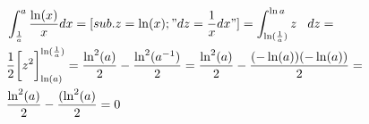 \documentclass[a4paper]{article}
\begin{document}
\section{}
\begin{align*}
& \int^a_{\frac{1}{a}} \frac{\ln(x)}{x} dx = [sub. z = \ln(x); "dz = \frac{1}{x} dx"] = \int^{\ln{a}}_{\ln(\frac{1}{a})} z\hspace{0.3cm} dz = \\
& \frac{1}{2} \bigg[ z^2 \bigg]_{\ln(a)}^{\ln(\frac{1}{a})} = \frac{\ln^2(a)}{2}-\frac{\ln^2(a^{-1})}{2} = \frac{\ln^2(a)}{2}-\frac{(-\ln(a))(-\ln(a))}{2} = \\
& \frac{\ln^2(a)}{2}-\frac{(\ln^2(a)}{2} = 0 
\end{align*}
\end{document}
